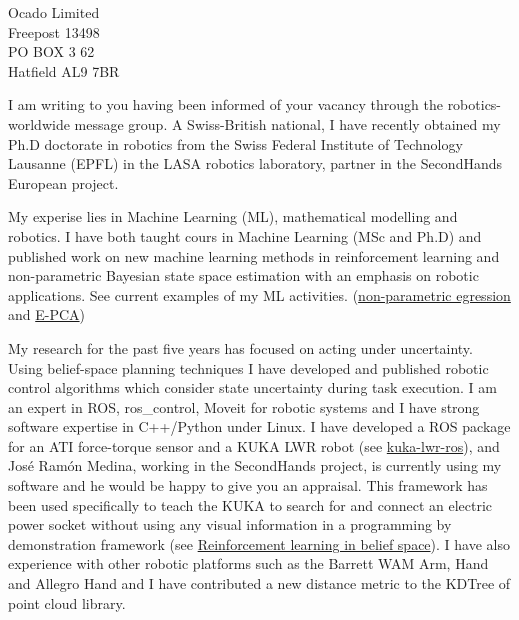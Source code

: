 \documentclass[11pt]{letter} %
\begin{document}
\begin{letter}{Ocado Limited\\ Freepost 13498\\ PO BOX 3 62\\ Hatfield AL9 7BR}


I am writing to you having been informed of your vacancy through the robotics-worldwide message group. A Swiss-British national, I have recently obtained my Ph.D doctorate in 
robotics from the Swiss Federal Institute of Technology Lausanne (EPFL) in the LASA robotics laboratory, partner in the SecondHands European project.

My experise lies in Machine Learning (ML), mathematical modelling and robotics. I have both taught cours in Machine Learning (MSc and Ph.D) and  published 
work on new machine learning methods in reinforcement learning and non-parametric Bayesian state space estimation with an emphasis on robotic applications. 
See current examples of my ML activities. (\href{http://chambrierg.com/projects/np_regression/}{non-parametric egression} and \href{http://chambrierg.com/projects/e-pca/}{E-PCA})

My research for the past five years has focused on acting under uncertainty. Using  belief-space planning techniques I have developed and published robotic control 
algorithms which consider state uncertainty during task execution. I  am an expert in   ROS, ros\_control, Moveit for robotic systems and I have strong software expertise 
in C++/Python under Linux. I have developed a ROS package for an ATI force-torque sensor and a KUKA LWR robot (see \href{https://github.com/epfl-lasa/kuka-lwr-ros}{kuka-lwr-ros}), 
and Jos\'{e} Ram\'{o}n Medina, working in the SecondHands project, is currently using my software and he would be happy to give you an appraisal. This framework has been used 
specifically to teach the KUKA to search for and connect an electric power socket without using any visual information in a programming by demonstration 
framework (see \href{http://chambrierg.com/projects/rl_belief_space/}{Reinforcement learning in belief space}). I  have also experience with other robotic 
platforms such as the Barrett WAM Arm, Hand and Allegro Hand and I have contributed a new distance metric to the KDTree of point cloud library.


\end{letter}
\end{document}
